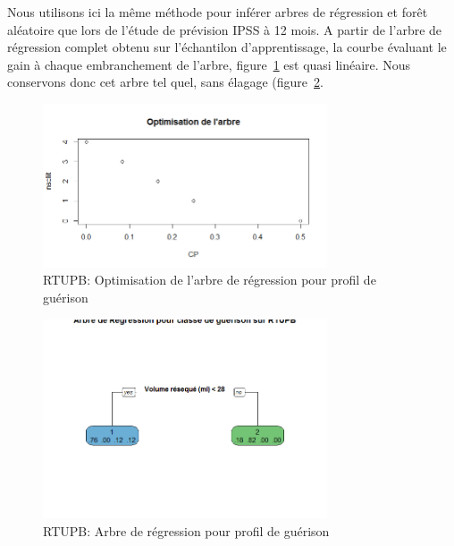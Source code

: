 %
%

%

Nous utilisons ici la même méthode pour inférer arbres de régression et forêt aléatoire que lors de l'étude de prévision IPSS à 12 mois. A partir de l'arbre de régression complet obtenu sur l'échantilon d'apprentissage, la courbe évaluant le gain à chaque embranchement de l'arbre, figure~\ref{fig-rtupb-regtree-optim-healing-class} est quasi linéaire. Nous conservons donc cet arbre tel quel, sans élagage (figure~\ref{fig-rtupb-regtree-healing-class}.

\begin{figure}[H]
\centering
\includegraphics[width=0.75\textwidth]{../Fig/RTUPB/rtupb-regtree-optim-healing-class.png}
\caption{RTUPB: Optimisation de l'arbre de régression pour profil de guérison}
\label{fig-rtupb-regtree-optim-healing-class}
\end{figure}

\begin{figure}[H]
\centering
\includegraphics[width=0.75\textwidth]{../Fig/RTUPB/rtupb-regtree-healing-class.png}
\caption{RTUPB: Arbre de régression pour profil de guérison}
\label{fig-rtupb-regtree-healing-class}
\end{figure}

